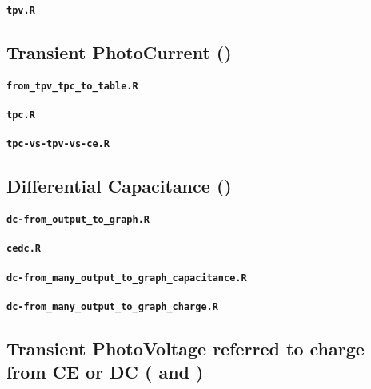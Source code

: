 		\paragraph{\texttt{tpv.R}}



	\subsection{Transient PhotoCurrent ()}\label{r_tpc}

		\paragraph{\texttt{from_tpv_tpc_to_table.R}}
		\paragraph{\texttt{tpc.R}}
		\paragraph{\texttt{tpc-vs-tpv-vs-ce.R}}


	\subsection{Differential Capacitance ()}\label{r_dc}

		\paragraph{\texttt{dc-from_output_to_graph.R}}
		\paragraph{\texttt{cedc.R}}
		\paragraph{\texttt{dc-from_many_output_to_graph_capacitance.R}}
		\paragraph{\texttt{dc-from_many_output_to_graph_charge.R}}

	\subsection{Transient PhotoVoltage referred to charge from CE or DC ( and )}\label{r_tpvcedc}



